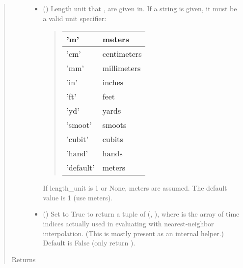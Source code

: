 \documentclass[letterpaper,10pt,english]{sphinxmanual}
\begin{document}
\begin{fulllineitems}
\begin{fulllineitems}
\begin{quote}
\begin{description}
\begin{itemize}
\item {} 
 () \textendash{} 
Length unit that ,  are given in.
If a string is given, it must be a valid unit specifier:
\begin{quote}


\begin{savenotes}\sphinxattablestart
\centering
\begin{tabulary}{\linewidth}[t]{|T|T|}
\hline

’m’
&
meters
\\
\hline
’cm’
&
centimeters
\\
\hline
’mm’
&
millimeters
\\
\hline
’in’
&
inches
\\
\hline
’ft’
&
feet
\\
\hline
’yd’
&
yards
\\
\hline
’smoot’
&
smoots
\\
\hline
’cubit’
&
cubits
\\
\hline
’hand’
&
hands
\\
\hline
’default’
&
meters
\\
\hline
\end{tabulary}
\par
\sphinxattableend\end{savenotes}
\end{quote}

If length\_unit is 1 or None, meters are assumed. The default
value is 1 (use meters).


\item {} 
 () \textendash{} Set to True to return a tuple of (,
), where  is the array of time indices
actually used in evaluating  with nearest-neighbor
interpolation. (This is mostly present as an internal helper.)
Default is False (only return ).

\end{itemize}

\item[{Returns}] \leavevmode


\end{description}
\end{quote}
\end{fulllineitems}
\end{fulllineitems}
\end{document}
